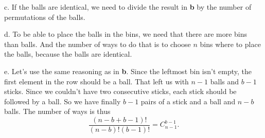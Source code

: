 \documentclass[a4paper,12pt]{article}
\newcommand{\subpar}[1]
{\medskip \noindent #1.}
\begin{document}
\subpar{c}  If the balls are identical, we need to divide the result
in \textbf{b} by the number of permutations of the balls.

\subpar{d}  To be able to place the balls in the bins, we need that
there are more bins than balls.  And the number of ways to do that is
to choose $n$ bins where to place the balls, because the balls are
identical.

\subpar{e}  Let's use the same reasoning as in \textbf{b}.  Since the
leftmost bin isn't empty, the first element in the row should be a
ball.  That left us with $n-1$ balls and $b-1$ sticks.  Since we
couldn't have two consecutive sticks, each stick should be followed by
a ball.  So we have finally $b-1$ pairs of a stick and a ball and
$n-b$ balls.  The number of ways is thus
\[ \frac{(n-b+b-1)!}{(n-b)!(b-1)!} = C_{n-1}^{b-1}.\]
\end{document}
